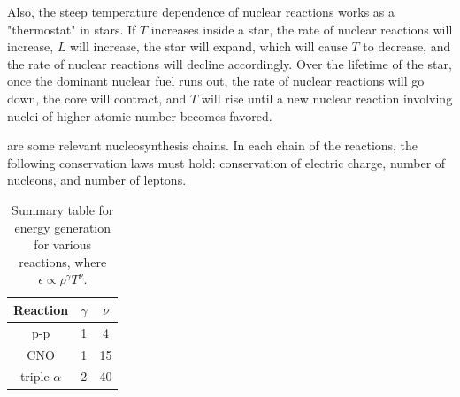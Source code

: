 Also, the steep temperature dependence of nuclear reactions works as a "thermostat" in stars.  If $T$ increases inside a star, the rate of nuclear reactions will increase, $L$ will increase, the star will expand, which will cause $T$ to decrease, and the rate of nuclear reactions will decline accordingly.  Over the lifetime of the star, once the dominant nuclear fuel runs out, the rate of nuclear reactions will go down, the core will contract, and $T$ will rise until a new nuclear reaction involving nuclei of higher atomic number becomes favored.

 are some relevant nucleosynthesis chains.  In each chain of the reactions, the following conservation laws must hold: conservation of electric charge, number of nucleons, and number of leptons.

\begin{table}[h!]
\centering
\begin{tabular}{c c c}
\hline\hline
Reaction&$\gamma$&$\nu$\\
\hline
p-p & 1 & 4\\
CNO & 1 & 15\\
triple-$\alpha$ & 2 & 40\\
\hline\hline
\end{tabular}
\caption{Summary table for energy generation for various reactions, where $\epsilon \propto \rho^{\gamma} T^{\nu}$.}
\end{table}
 

